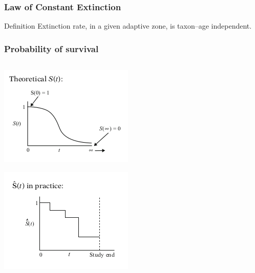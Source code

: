 \documentclass{beamer}
\begin{document}
\begin{frame}
  \frametitle{Law of Constant Extinction}

  \begin{alertblock}{Definition}
    Extinction rate, in a given adaptive zone, is taxon--age independent.

    \tiny{}
  \end{alertblock}
\end{frame}

\begin{frame}
  \frametitle{Probability of survival}

  \begin{columns}
    \begin{column}{0.5\textwidth} 
      \includegraphics[height = 0.4\textheight, width = \textwidth, keepaspectratio = true]{figure/ideal}

      \includegraphics[height = 0.4\textheight, width = \textwidth, keepaspectratio = true]{figure/prac}


\end{column}
\end{columns}
\end{frame}
\end{document}
